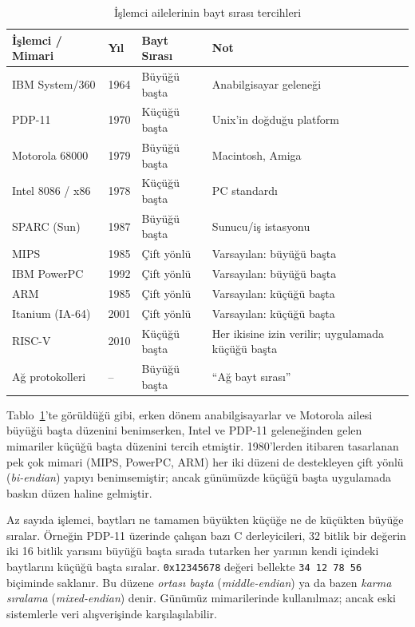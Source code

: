 \begin{table}[H]
\centering
\caption{İşlemci ailelerinin bayt sırası tercihleri}
\label{tab:endianness-tarihce}
\small
\begin{tabular}{llll}
\toprule
\textbf{İşlemci / Mimari} & \textbf{Yıl} & \textbf{Bayt Sırası} & \textbf{Not} \\
\midrule
IBM System/360       & 1964 & Büyüğü başta   & Anabilgisayar geleneği \\
PDP-11               & 1970 & Küçüğü başta   & Unix'in doğduğu platform \\
Motorola 68000       & 1979 & Büyüğü başta   & Macintosh, Amiga \\
Intel 8086 / x86     & 1978 & Küçüğü başta   & PC standardı \\
SPARC (Sun)          & 1987 & Büyüğü başta   & Sunucu/iş istasyonu \\
MIPS                 & 1985 & Çift yönlü     & Varsayılan: büyüğü başta \\
IBM PowerPC          & 1992 & Çift yönlü     & Varsayılan: büyüğü başta \\
ARM                  & 1985 & Çift yönlü     & Varsayılan: küçüğü başta \\
Itanium (IA-64)      & 2001 & Çift yönlü     & Varsayılan: küçüğü başta \\
RISC-V               & 2010 & Küçüğü başta   & Her ikisine izin verilir; uygulamada küçüğü başta \\
Ağ protokolleri      & --   & Büyüğü başta   & ``Ağ bayt sırası'' \\
\bottomrule
\end{tabular}
\end{table}

Tablo~\ref{tab:endianness-tarihce}'te görüldüğü gibi, erken dönem anabilgisayarlar ve Motorola ailesi büyüğü başta düzenini benimserken, Intel ve PDP-11 geleneğinden gelen mimariler küçüğü başta düzenini tercih etmiştir. 1980'lerden itibaren tasarlanan pek çok mimari (MIPS, PowerPC, ARM) her iki düzeni de destekleyen çift yönlü (\emph{bi-endian}) yapıyı benimsemiştir; ancak günümüzde küçüğü başta uygulamada baskın düzen haline gelmiştir.

\begin{bilginot}
Az sayıda işlemci, baytları ne tamamen büyükten küçüğe ne de küçükten büyüğe sıralar. Örneğin PDP-11 üzerinde çalışan bazı C derleyicileri, 32 bitlik bir değerin iki 16 bitlik yarısını büyüğü başta sırada tutarken her yarının kendi içindeki baytlarını küçüğü başta sıralar. \texttt{0x12345678} değeri bellekte \texttt{34\,12\,78\,56} biçiminde saklanır. Bu düzene \emph{ortası başta} (\emph{middle-endian}) ya da bazen \emph{karma sıralama} (\emph{mixed-endian}) denir. Günümüz mimarilerinde kullanılmaz; ancak eski sistemlerle veri alışverişinde karşılaşılabilir.
\end{bilginot}

